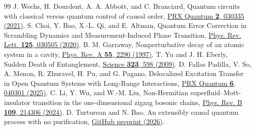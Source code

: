 \documentclass[aps,prl,reprint,superscriptaddress,longbibliography,bibnotes,floatfix]{revtex4-2}
\begin{document}
\begin{thebibliography}{99}
 J. Wechs, H. Dourdent, A. A. Abbott, and C. Branciard, Quantum circuits with classical versus quantum control of causal order, \href{https://doi.org/10.1103/PRXQuantum.2.030335}{PRX Quantum \textbf{2}, 030335 (2021)}.
 S. Choi, Y. Bao, X.-L. Qi, and E. Altman, Quantum Error Correction in Scrambling Dynamics and Measurement-Induced Phase Transition, \href{https://doi.org/10.1103/PhysRevLett.125.030505}{Phys. Rev. Lett. \textbf{125}, 030505 (2020)}.
 B. M. Garraway, Nonperturbative decay of an atomic system in a cavity, \href{https://doi.org/10.1103/PhysRevA.55.2290}{Phys. Rev. A \textbf{55}, 2290 (1997)}.
 T. Yu and J. H. Eberly, Sudden Death of Entanglement, \href{https://doi.org/10.1126/science.1167343}{Science \textbf{323}, 598 (2009)}.
 D. Fallas Padilla, V. So, A. Menon, R. Zhuravel, H. Pu, and G. Pagano, Delocalized Excitation Transfer in Open Quantum Systems with Long-Range Interactions, \href{https://doi.org/10.1103/bxwl-sbsn}{PRX Quantum \textbf{6}, 040301 (2025)}.
 C. Li, Y. Wu, and W.-M. Liu, Non-Hermitian superfluid--Mott-insulator transition in the one-dimensional zigzag bosonic chains, \href{https://doi.org/10.1103/PhysRevB.109.214306}{Phys. Rev. B \textbf{109}, 214306 (2024)}.
 D. Turturean and N. Bao, An extensibly causal quantum process with no purification, \href{https://github.com/physical-superintelligence/oqp-batch-2026/blob/7049357c42a8fe85262da08fdc10d57b4d9e67a0/oqp43-extensible-causality/paper/oqp43-extensible-causality.pdf}{GitHub preprint (2026)}.
\end{thebibliography}
\end{document}
